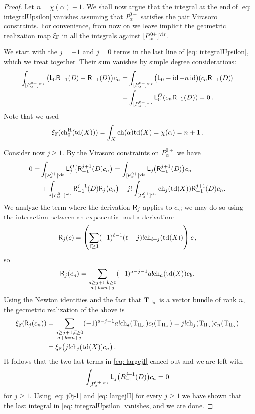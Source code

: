 \documentclass[a4paper, 12pt]{amsart}
\begin{document}
\begin{proof}
Let $n=\chi(\alpha)-1$. We shall now argue that the integral at the end of \eqref{eq: integralUpsilon} vanishes assuming that $P_\alpha^{0+}$ satisfies the pair Virasoro constraints. For convenience, from now on we leave implicit the geometric realization map $\xi_{\mathbb{F}}$ in all the integrals against $[P_\alpha^{0+}]^{\mathrm{vir}}$.

We start with the $j=-1$ and $j=0$ terms in the last line of \eqref{eq: integralUpsilon}, which we treat together.  Their sum vanishes by simple degree considerations:
\begin{align}\nonumber \int_{[P^{0+}_\alpha]^{\mathrm{vir}}} \big({\mathsf{L}}_0 \mathsf{R}_{-1}(D)-\mathsf{R}_{-1}(D)\big) c_{n}&= \int_{[P^{0+}_\alpha]^{\mathrm{vir}}} \big({\mathsf{L}}_0-\operatorname{id}-n\operatorname{id})(c_n\mathsf{R}_{-1}(D))\\
&=\int_{[P^{0+}_\alpha]^{\mathrm{vir}}} {\mathsf{L}}_0^{\mathcal O}(c_n\mathsf{R}_{-1}(D))=0\,.\label{eq: j0j-1}
\end{align}
Note that we used
\[\xi_{{\mathbb{F}}}(\mathrm{ch}_0^{\mathrm{H}}(\mathrm{td}(X)))=\int_X \mathrm{ch}(\alpha)\mathrm{td}(X)=\chi(\alpha)=n+1\,.\]

Consider now $j\geq 1$. By the Virasoro constraints on $P^{0+}_\alpha$ we have
\begin{align}\nonumber 0=&\int_{[P_\alpha^{0+}]^{\mathrm{vir}}}{\mathsf{L}}_j^{{\mathcal O}}\big(\mathsf{R}_{-1}^{j+1}(D)c_{n}\big)=\int_{[P_\alpha^{0+}]^{\mathrm{vir}}}{\mathsf{L}}_j\big(\mathsf{R}_{-1}^{j+1}(D)\big)c_{n}\\
&+\int_{[P_\alpha^{0+}]^{\mathrm{vir}}}\mathsf{R}_{-1}^{j+1}(D)\mathsf{R}_j\big(c_{n}\big)-j!\int_{[P_\alpha^{0+}]^{\mathrm{vir}}} \mathrm{ch}_j(\mathrm{td}(X))\mathsf{R}_{-1}^{j+1}(D)c_{n}. \label{eq: largejI}
\end{align}
We analyze the term where the derivation $\mathsf{R}_j$ applies to $c_{n}$; we may do so using the interaction between an exponential and a derivation:
\[\mathsf{R}_j(c)=\left(\sum_{\ell \geq 1}(-1)^{\ell-1} (\ell+j)! \mathrm{ch}_{\ell+j}(\mathrm{td}(X))\right)c\,,\]
so
\[\mathsf{R}_j(c_{n})=\sum_{\substack{a\geq j+1, b\geq 0\\
a+b=n+j}} (-1)^{a-j-1} a!\mathrm{ch}_{a}(\mathrm{td}(X))c_{b}.\]
Using the Newton identities and the fact that $\mathrm{T}_{\Pi_\alpha}$ is a vector bundle of rank $n$, the geometric realization of the above is
\begin{align}\nonumber \label{eq: Trelvectorbundle}\xi_{\mathbb{F}}(\mathsf{R}_j(c_{n}))&=\sum_{\substack{a\geq j+1, b\geq 0\\a+b=n+j}} (-1)^{a-j-1} a!\mathrm{ch}_{a}(\mathrm{T}_{\Pi_\alpha})c_{b}(\mathrm{T}_{\Pi_\alpha})=j!\mathrm{ch}_{j}(\mathrm{T}_{\Pi_\alpha})c_{n}(\mathrm{T}_{\Pi_\alpha})\\
&=\xi_{\mathbb{F}}\big(j! \mathrm{ch}_j(\mathrm{td}(X))c_n\big)\,.
\end{align}
It follows that the two last terms in \eqref{eq: largejI} cancel out and we are left with 
\begin{equation}
\label{eq: largejII} \int_{[P_\alpha^{0+}]^{\mathrm{vir}}}{\mathsf{L}}_j\big(R_{-1}^{j+1}(D)\big)c_{n}=0
\end{equation}
for $j\geq 1$. Using \eqref{eq: j0j-1} and \eqref{eq: largejII} for every $j\geq 1$ we have shown that the last integral in \eqref{eq: integralUpsilon} vanishes, and we are done. \qedhere
\end{proof}
\end{document}
